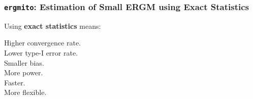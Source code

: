 \documentclass[aspectratio=169, 9pt, handout]{beamer}
\begin{document}
% 
% 
% 

\begin{frame}[c,label=ergmito-checklist]
\frametitle{\texttt{ergmito}: Estimation of Small ERGM using Exact Statistics}

\begin{minipage}[m]{.28\linewidth}
	
	\small Using \textbf{exact statistics} means:\normalsize
	
	 Higher convergence rate.\\
	 Lower type-I error rate.\\
	 Smaller bias.\\
	 More power.\\
	 Faster.\\
	 More flexible.
	

\end{minipage}
\end{frame}
\end{document}
